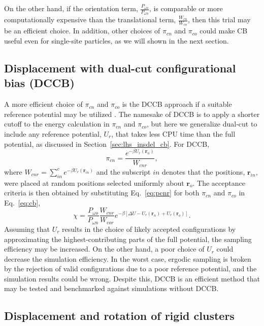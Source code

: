 \documentclass[
  9pt,
  bestpractices,
]{livecoms}
\begin{document}
On the other hand, if the orientation term, $\frac{P_{\omega o}}{P_{\omega n}}$, is comparable or more computationally expensive than the translational term, $\frac{W_{cn}}{W_{co}}$, then this trial may be an efficient choice.
In addition, other choices of $\pi_{cn}$ and $\pi_{co}$ could make CB useful even for single-site particles, as we will shown in the next section.

\subsection{\label{sec:lhs_disp_dccb}Displacement with dual-cut configurational bias (DCCB)}

A more efficient choice of $\pi_{cn}$ and $\pi_{co}$ is the DCCB approach if a suitable reference potential may be utilized \cite{vlugt_improving_1998}.
The namesake of DCCB is to apply a shorter cutoff to the energy calculation in $\pi_{cn}$ and $\pi_{co}$, but here we generalize dual-cut to include any reference potential, $U_r$, that takes less CPU time than the full potential, as discussed in Section~\ref{sec:lhs_insdel_cb}.
For DCCB,
\begin{equation}
\pi_{cn}=\frac{e^{-\beta U_r(\mathbf{r}_n)}}{W_{cnr}},
\label{eq:pcnr}
\end{equation}
where $W_{cnr}=\sum_{in}^c e^{-\beta U_r(\mathbf{r}_{in})}$ and the subscript $in$ denotes that the positions, $\mathbf{r}_{in}$, were placed at random positions selected uniformly about $\mathbf{r}_o$.
The acceptance criteria is then obtained by substituting Eq.~\ref{eq:pcnr} for both $\pi_{cn}$ and $\pi_{co}$ in Eq.~\ref{eq:cb},
\begin{equation}
\chi = \frac{P_{\omega o}}{P_{\omega n}}\frac{W_{cnr}}{W_{cor}}e^{-\beta [\Delta U - U_r(\mathbf{r}_n) + U_r(\mathbf{r}_o)]}.
\end{equation}
Assuming that $U_r$ results in the choice of likely accepted configurations by approximating the highest-contributing parts of the full potential, the sampling efficiency may be increased.
On the other hand, a poor choice of $U_r$ could decrease the simulation efficiency.
In the worst case, ergodic sampling is broken by the rejection of valid configurations due to a poor reference potential, and the simulation results could be wrong.
Despite this, DCCB is an efficient method that may be tested and benchmarked against simulations without DCCB.

\subsection{\label{sec:lhs_cluster}Displacement and rotation of rigid clusters}
\end{document}
